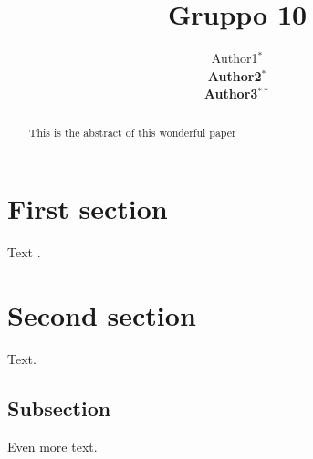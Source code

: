 \documentclass[a4paper,9pt,twoside]{article}
\begin{document}
\title{Gruppo 10}

\author{Author1$^*$ \\
{\normalsize \bf Author2}$^*$ \\
{\normalsize \bf Author3}$^{**}$ 
\AND {}
\AND {} }


\maketitle\thispagestyle{empty} %


\begin{abstract}
This is the abstract of this wonderful paper
\end{abstract}

\section{First section}

Text \cite{Banko2001a}.

\section{Second section}

Text.

\subsection{Subsection}

Even more text.


 
  
\end{document}

